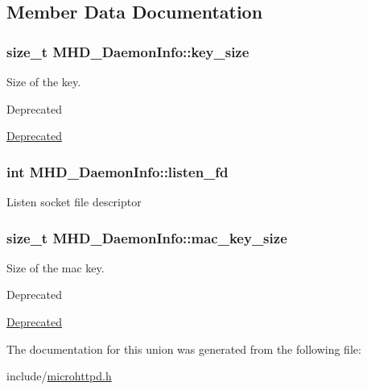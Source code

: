 \subsection{\-Member \-Data \-Documentation}
\hypertarget{unionMHD__DaemonInfo_aebd8c774d3a7e77d359b0603f4515585}{
\subsubsection[{key\-\_\-size}]{\setlength{\rightskip}{0pt plus 5cm}size\-\_\-t {\bf \-M\-H\-D\-\_\-\-Daemon\-Info\-::key\-\_\-size}}}\label{unionMHD__DaemonInfo_aebd8c774d3a7e77d359b0603f4515585}
\-Size of the key. \begin{DoxyRefDesc}{\-Deprecated}
\item[\hyperlink{deprecated__deprecated000004}{\-Deprecated}]\end{DoxyRefDesc}
\hypertarget{unionMHD__DaemonInfo_ab1967e0d6ee4ff8cf994459ed8e9f69d}{
\subsubsection[{listen\-\_\-fd}]{\setlength{\rightskip}{0pt plus 5cm}int {\bf \-M\-H\-D\-\_\-\-Daemon\-Info\-::listen\-\_\-fd}}}\label{unionMHD__DaemonInfo_ab1967e0d6ee4ff8cf994459ed8e9f69d}
\-Listen socket file descriptor \hypertarget{unionMHD__DaemonInfo_a9130cd67f760ff4d092956100bfc86e3}{
\subsubsection[{mac\-\_\-key\-\_\-size}]{\setlength{\rightskip}{0pt plus 5cm}size\-\_\-t {\bf \-M\-H\-D\-\_\-\-Daemon\-Info\-::mac\-\_\-key\-\_\-size}}}\label{unionMHD__DaemonInfo_a9130cd67f760ff4d092956100bfc86e3}
\-Size of the mac key. \begin{DoxyRefDesc}{\-Deprecated}
\item[\hyperlink{deprecated__deprecated000005}{\-Deprecated}]\end{DoxyRefDesc}


\-The documentation for this union was generated from the following file\-:\begin{DoxyCompactItemize}
\item 
include/\hyperlink{microhttpd_8h}{microhttpd.\-h}\end{DoxyCompactItemize}
